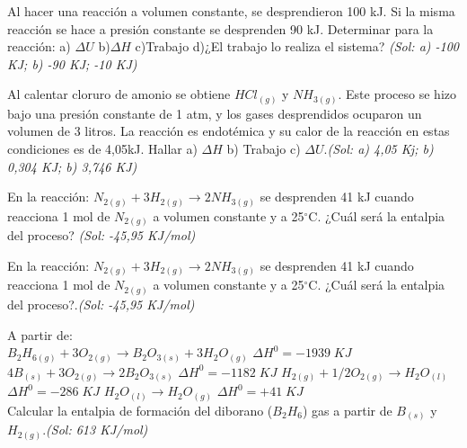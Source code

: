 \begin{multicols}{2}

\begin{problem}
	Al hacer una reacción a volumen constante, se desprendieron 100 kJ. Si la misma reacción se hace a presión constante se desprenden 90 kJ. Determinar para la reacción: a) $\Delta U$ b)$\Delta H$ c)Trabajo d)¿El trabajo lo realiza el sistema? \textit{\scriptsize (Sol: a) -100 KJ; b) -90 KJ; -10 KJ)}
\end{problem}

\begin{problem}
	Al calentar cloruro de amonio se obtiene $HCl_{(g)}$ y $NH_{3(g)}$. Este proceso se hizo bajo una presión constante de 1 atm, y los gases desprendidos ocuparon un volumen de 3 litros. La reacción es endotémica y su calor de la reacción en estas condiciones es de 4,05kJ. Hallar a) $ \Delta H$ b) Trabajo c) $\Delta U$.\textit{\scriptsize (Sol: a) 4,05 Kj; b) 0,304 KJ; b) 3,746 KJ)} 
\end{problem}

\begin{problem}
	En la reacción: $N_{2(g)} + 3H_{2(g)}  \longrightarrow 2NH_{3(g)}$ se desprenden 41 kJ cuando reacciona 1 mol de $N_{2(g)}$ a volumen constante y a 25$^{\circ}$C. ¿Cuál será la entalpia del proceso? \textit{\scriptsize (Sol: -45,95 KJ/mol)}	
\end{problem}

\begin{problem}
	En la reacción: $N_{2(g)} + 3 H_{2(g)} \longrightarrow  2NH_{3(g)}$ se desprenden 41 kJ cuando reacciona 1 mol de $N_{2(g)}$ a volumen constante y a 25$^{\circ}$C. ¿Cuál será la entalpia del proceso?.\textit{\scriptsize (Sol: -45,95 KJ/mol)}
\end{problem}

\begin{problem}
	A partir de:\\ 
	$B_2H_{6(g)} + 3O_{2(g)} \longrightarrow  B_2O_{3(s)} +3 H_2O_{(g)}$ $\Delta H^0 = -1939\; KJ$
      $4B_{(s)} + 3O_{2(g)} \longrightarrow  2B_2O_{3(s)}$ $\Delta H^0 = -1182\; KJ$
      $H_{2(g)} +1/2O_{2(g)} \longrightarrow  H_2O_{(l)}$ $\Delta H^0 = -286\; KJ$
      $H_2O_{(l)} \longrightarrow   H_2O_{(g)}$	  $\Delta H^0 = +41\; KJ$\\
      
      Calcular la entalpia de formación del diborano ($B_2H_6$) gas a partir de $B_{(s)}$ y $H_{2(g)}$.\textit{\scriptsize(Sol: 613 KJ/mol)} 


\end{problem}
\end{multicols}
